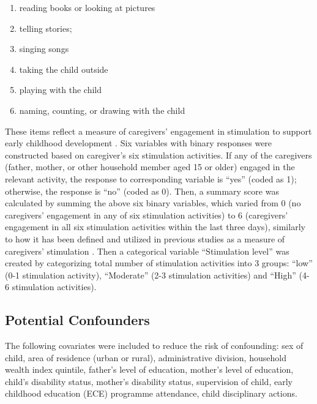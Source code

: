 \documentclass[
  12pt,
  oneside]{report}
\providecommand{\tightlist}{%
  \setlength{\itemsep}{0pt}\setlength{\parskip}{0pt}}
\begin{document}
\begin{enumerate}
\def\labelenumi{(\arabic{enumi})}
\tightlist
\item
  reading books or looking at pictures
\item
  telling stories;
\item
  singing songs
\item
  taking the child outside
\item
  playing with the child
\item
  naming, counting, or drawing with the child
\end{enumerate}

These items reflect a measure of caregivers' engagement in stimulation to support early childhood development \citep{bornstein2012cognitive}. Six variables with binary responses were constructed based on caregiver's six stimulation activities. If any of the caregivers (father, mother, or other household member aged 15 or older) engaged in the relevant activity, the response to corresponding variable is ``yes'' (coded as 1); otherwise, the response is ``no'' (coded as 0). Then, a summary score was calculated by summing the above six binary variables, which varied from 0 (no caregivers' engagement in any of six stimulation activities) to 6 (caregivers' engagement in all six stimulation activities within the last three days), similarly to how it has been defined and utilized in previous studies as a measure of caregivers' stimulation \citep{bornstein2012cognitive, sun2016factors}. Then a categorical variable ``Stimulation level'' was created by categorizing total number of stimulation activities into 3 groups: ``low'' (0-1 stimulation activity), ``Moderate'' (2-3 stimulation activities) and ``High'' (4-6 stimulation activities).

\hypertarget{potential-confounders}{%
\subsection{Potential Confounders}\label{potential-confounders}}

The following covariates were included to reduce the risk of confounding: sex of child, area of residence (urban or rural), administrative division, household wealth index quintile, father's level of education, mother's level of education, child's disability status, mother's disability status, supervision of child, early childhood education (ECE) programme attendance, child disciplinary actions.
\end{document}
